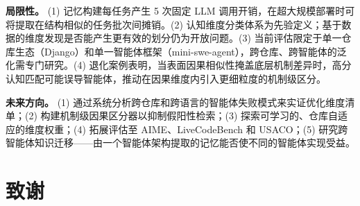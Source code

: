 \documentclass[UTF8,twocolumn]{ctexart}
\begin{document}
\textbf{局限性。} (1) 记忆构建每任务产生 5 次固定 LLM 调用开销，在超大规模部署时可将提取在结构相似的任务批次间摊销。(2) 认知维度分类体系为先验定义；基于数据的维度发现是否能产生更有效的划分仍为开放问题。(3) 当前评估限定于单一仓库生态（Django）和单一智能体框架（mini-swe-agent），跨仓库、跨智能体的泛化需专门研究。(4) 退化案例表明，当表面因果相似性掩盖底层机制差异时，高分认知匹配可能误导智能体，推动在因果维度内引入更细粒度的机制级区分。

\textbf{未来方向。} (1) 通过系统分析跨仓库和跨语言的智能体失败模式来实证优化维度清单；(2) 构建机制级因果区分器以抑制假阳性检索；(3) 探索可学习的、仓库自适应的维度权重；(4) 拓展评估至 AIME、LiveCodeBench 和 USACO；(5) 研究跨智能体知识迁移——由一个智能体架构提取的记忆能否使不同的智能体实现受益。

\section*{致谢}

\end{document}
